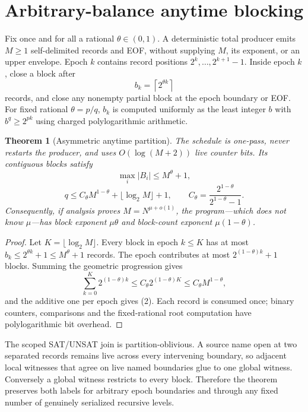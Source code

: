 \documentclass[11pt]{article}
\newtheorem{theorem}{Theorem}
\begin{document}
\section{Arbitrary-balance anytime blocking}
Fix once and for all a rational $\theta\in(0,1)$.  A deterministic total
producer emits $M\ge1$ self-delimited records and EOF, without supplying
$M$, its exponent, or an upper envelope.  Epoch $k$ contains record positions
$2^k,\ldots,2^{k+1}-1$.  Inside epoch $k$, close a block after
\[
 b_k=\left\lceil 2^{\theta k}\right\rceil
\]
records, and close any nonempty partial block at the epoch boundary or EOF.
For fixed rational $\theta=p/q$, $b_k$ is computed uniformly as the least
integer $b$ with $b^q\ge2^{pk}$ using charged polylogarithmic arithmetic.

\begin{theorem}[Asymmetric anytime partition]\label{th:asym}
The schedule is one-pass, never restarts the producer, and uses
$O(\log(M+2))$ live counter bits.  Its contiguous blocks satisfy
\[
 \max_i |B_i|\le M^\theta+1,                              \tag{1}
\]
\[
 q\le C_\theta M^{1-\theta}+\lfloor\log_2M\rfloor+1,
 \qquad C_\theta=\frac{2^{1-\theta}}{2^{1-\theta}-1}.    \tag{2}
\]
Consequently, if analysis proves $M=N^{\mu+o(1)}$, the program---which does
not know $\mu$---has block exponent $\mu\theta$ and block-count exponent
$\mu(1-\theta)$.
\end{theorem}
\begin{proof}
Let $K=\lfloor\log_2M\rfloor$.  Every block in epoch $k\le K$ has at most
$b_k\le2^{\theta k}+1\le M^\theta+1$ records.  The epoch contributes at most
$2^{(1-\theta)k}+1$ blocks.  Summing the geometric progression gives
\[
 \sum_{k=0}^{K}2^{(1-\theta)k}
 \le C_\theta 2^{(1-\theta)K}
 \le C_\theta M^{1-\theta},
\]
and the additive one per epoch gives (2).  Each record is consumed once;
binary counters, comparisons and the fixed-rational root computation have
polylogarithmic bit overhead.
\end{proof}

The scoped SAT/UNSAT join is partition-oblivious.  A source name open at two
separated records remains live across every intervening boundary, so adjacent
local witnesses that agree on live named boundaries glue to one global
witness.  Conversely a global witness restricts to every block.  Therefore
the theorem preserves both labels for arbitrary epoch boundaries and through
any fixed number of genuinely serialized recursive levels.
\end{document}
